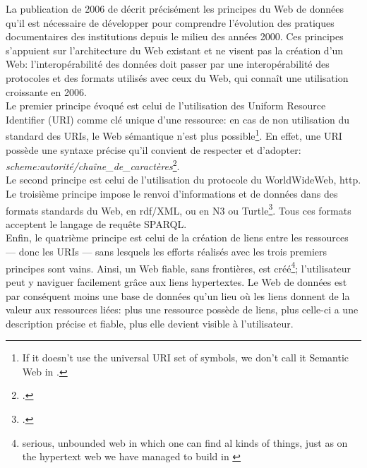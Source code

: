 La publication de 2006 de  décrit précisément les principes du Web de données qu'il est nécessaire de développer pour comprendre l'évolution des pratiques documentaires des institutions depuis le milieu des années 2000. Ces principes s'appuient sur l'architecture du Web existant et ne visent pas la création d'un Web: l'interopérabilité des données doit passer par une interopérabilité des protocoles et des formats utilisés avec ceux du Web, qui connaît une utilisation croissante en 2006.\\

Le premier principe évoqué est celui de l'utilisation des Uniform Resource Identifier (URI) comme clé unique d'une ressource: en cas de non utilisation du standard des URIs, le Web sémantique n'est plus possible\footnote{\og If it doesn't use the universal URI set of symbols, we don't call it Semantic Web\fg{} in \cite{berners-lee_linked_2006}.}. En effet, une URI possède une syntaxe précise qu'il convient de respecter et d'adopter: \textit{scheme:autorité/chaîne\_de\_caractères}\footcite[§40]{bermes_convergence_2013}.\\

Le second principe est celui de l'utilisation du protocole du WorldWideWeb, \ac{http}.\\

Le troisième principe impose le renvoi d'informations et de données dans des formats standards du Web, en \ac{rdf}/XML, ou en N3 ou Turtle\footcite{berners-lee_linked_2006}. Tous ces formats acceptent le langage de requête SPARQL.\\

Enfin, le quatrième principe est celui de la création de liens entre les ressources --- donc les URIs --- sans lesquels les efforts réalisés avec les trois premiers principes sont vains. Ainsi, un Web fiable, sans frontières, est créé\footnote{\og serious, unbounded web in which one can find al kinds of things, just as on the hypertext web we have managed to build\fg{} in \cite{berners-lee_linked_2006}}; l'utilisateur peut y naviguer facilement grâce aux liens hypertextes. Le Web de données est par conséquent moins une base de données qu'un lieu où les liens donnent de la valeur aux ressources liées: plus une ressource possède de liens, plus celle-ci a une description précise et fiable, plus elle devient visible à l'utilisateur.\\

